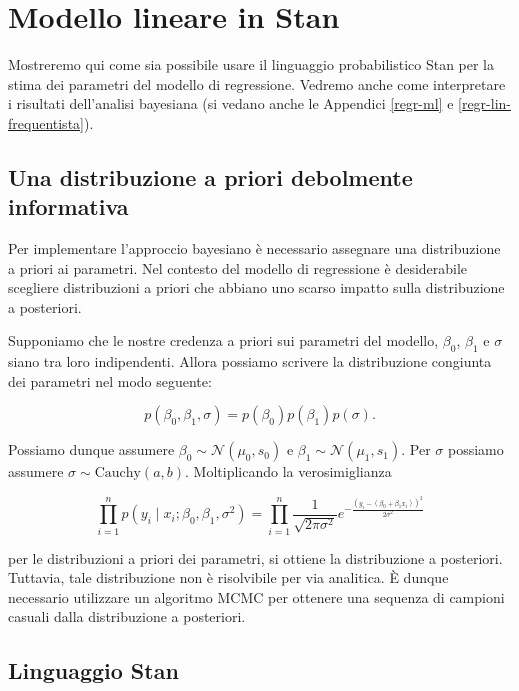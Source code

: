 \documentclass[
  11pt,
]{krantz}
\begin{document}
\hypertarget{reg-lin-stan}{%
\chapter{Modello lineare in Stan}\label{reg-lin-stan}}

Mostreremo qui come sia possibile usare il linguaggio probabilistico Stan per la stima dei parametri del modello di regressione. Vedremo anche come interpretare i risultati dell'analisi bayesiana (si vedano anche le Appendici \ref{regr-ml} e \ref{regr-lin-frequentista}).

\hypertarget{una-distribuzione-a-priori-debolmente-informativa}{%
\section{Una distribuzione a priori debolmente informativa}\label{una-distribuzione-a-priori-debolmente-informativa}}

Per implementare l'approccio bayesiano è necessario assegnare una distribuzione a priori ai parametri. Nel contesto del modello di regressione è desiderabile scegliere distribuzioni a priori che abbiano uno scarso impatto sulla distribuzione a posteriori.

Supponiamo che le nostre credenza a priori sui parametri del modello, \(\beta_0\), \(\beta_1\) e \(\sigma\) siano tra loro indipendenti. Allora possiamo scrivere la distribuzione congiunta dei parametri nel modo seguente:

\[
p(\beta_0, \beta_1, \sigma) = p(\beta_0)p(\beta_1)p(\sigma).
\]

Possiamo dunque assumere \(\beta_0 \sim \mathcal{N}(\mu_0, s_0)\) e \(\beta_1 \sim \mathcal{N}(\mu_1, s_1)\). Per \(\sigma\) possiamo assumere \(\sigma \sim \mbox{Cauchy}(a, b)\). Moltiplicando la verosimiglianza

\[
\prod_{i=1}^n p(y_i \mid x_i; \beta_0, \beta_1, \sigma^2) = \prod_{i=1}^n \frac{1}{\sqrt{2 \pi \sigma^2}}e^{-\frac{(y_i-(\beta_0+\beta_1 x_i))^2}{2\sigma^2}}
\]

per le distribuzioni a priori dei parametri, si ottiene la distribuzione a posteriori. Tuttavia, tale distribuzione non è risolvibile per via analitica. È dunque necessario utilizzare un algoritmo MCMC per ottenere una sequenza di campioni casuali dalla distribuzione a posteriori.

\hypertarget{linguaggio-stan}{%
\section{Linguaggio Stan}\label{linguaggio-stan}}
\end{document}
